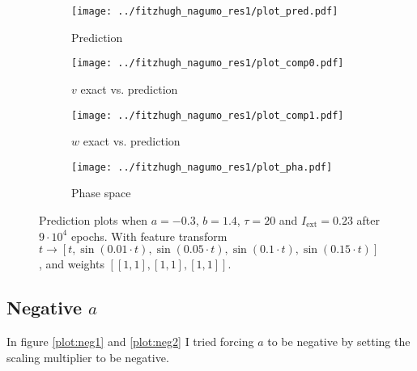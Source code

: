 \documentclass[a4paper]{article}
\begin{document}
\begin{figure}[H]
	\centering 
	\begin{subfigure}[b]{0.47\textwidth}
		\centering
		\texttt{[image: ../fitzhugh\_nagumo\_res1/plot\_pred.pdf]}
		\caption{Prediction}
		\label{fig:all11a}
	\end{subfigure}
	\begin{subfigure}[b]{0.47\textwidth}
		\centering
		\texttt{[image: ../fitzhugh\_nagumo\_res1/plot\_comp0.pdf]}
		\caption{$v$ exact vs. prediction}
		\label{fig:all11b}
	\end{subfigure}
	\begin{subfigure}[b]{0.47\textwidth}
		\centering
		\texttt{[image: ../fitzhugh\_nagumo\_res1/plot\_comp1.pdf]}
		\caption{$w$ exact vs. prediction}
		\label{fig:all11c}
	\end{subfigure}
	\begin{subfigure}[b]{0.47\textwidth}
		\centering
		\texttt{[image: ../fitzhugh\_nagumo\_res1/plot\_pha.pdf]}
		\caption{Phase space}
		\label{fig:all11d}
	\end{subfigure}
	\caption{Prediction plots when $a=-0.3$, $b=1.4$, $\tau=20$ and $ I_{\text{ext}}=0.23$ after $9\cdot10^4$ epochs. With feature transform $t \rightarrow \left[ t, \sin(0.01 \cdot  t), \sin(0.05 \cdot  t), \sin(0.1 \cdot  t), \sin(0.15 \cdot  t)\right] $, and weights $\left[ \left[ 1, 1\right], \left[ 1, 1\right], \left[ 1, 1\right]\right]$.}
	\label{plot:all11}
\end{figure}


\subsection{Negative $a$}

In figure \ref{plot:neg1} and \ref{plot:neg2} I tried forcing $a$ to be negative by setting the scaling multiplier to be negative.
\end{document}

